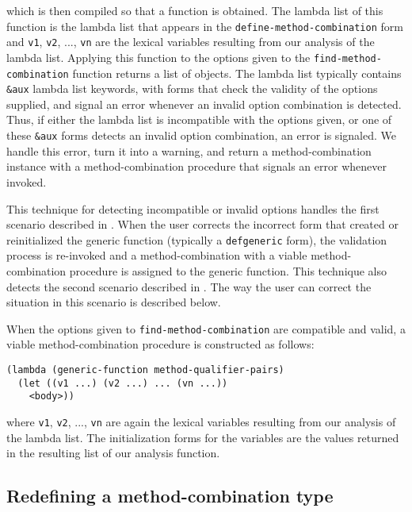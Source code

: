 \noindent
which is then compiled so that a function is obtained.  The lambda
list of this function is the lambda list that appears in the
\texttt{define-method-combination} form and \texttt{v1}, \texttt{v2},
..., \texttt{vn} are the lexical variables resulting from our analysis
of the lambda list.  Applying this function to the options given to
the \texttt{find-method-combination} function returns a list of
objects.  The lambda list typically contains \texttt{\&aux} lambda
list keywords, with forms that check the validity of the options
supplied, and signal an error whenever an invalid option combination
is detected.  Thus, if either the lambda list is incompatible with the
options given, or one of these \texttt{\&aux} forms detects an invalid
option combination, an error is signaled.  We handle this error, turn
it into a warning, and return a method-combination instance with a
method-combination procedure that signals an error whenever invoked.

This technique for detecting incompatible or invalid options handles
the first scenario described in .  When the
user corrects the incorrect form that created or reinitialized the
generic function (typically a \texttt{defgeneric} form), the
validation process is re-invoked and a method-combination with a
viable method-combination procedure is assigned to the generic
function.  This technique also detects the second scenario described
in .  The way the user can correct the
situation in this scenario is described below.

When the options given to \texttt{find-method-combination} are
compatible and valid, a viable method-combination procedure is
constructed as follows:

\begin{verbatim}
(lambda (generic-function method-qualifier-pairs)
  (let ((v1 ...) (v2 ...) ... (vn ...))
    <body>))
\end{verbatim}

\noindent
where \texttt{v1}, \texttt{v2}, ..., \texttt{vn} are again the lexical
variables resulting from our analysis of the lambda list.  The
initialization forms for the variables are the values returned in the
resulting list of our analysis function.

\subsection{Redefining a method-combination type}

